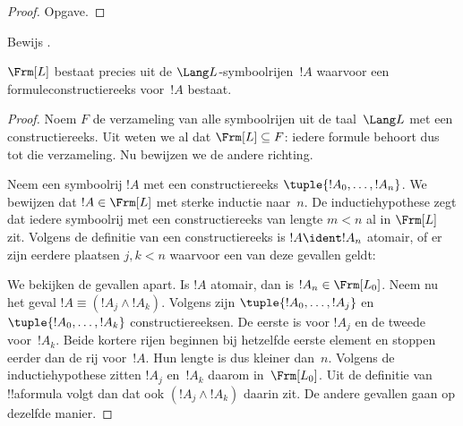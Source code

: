\documentclass[../../../include/open-logic-section]{subfiles}
\begin{document}
\begin{proof}
Opgave.
\end{proof}

\begin{prob}
Bewijs .
\end{prob}

\begin{thm}
$\Frm[L]$ bestaat precies uit de $\Lang L$-symboolrijen~$!A$
waarvoor een formuleconstructiereeks voor~$!A$ bestaat.
\end{thm}

\begin{proof}
Noem $F$ de verzameling van alle symboolrijen uit de taal~$\Lang L$ met
een constructiereeks. Uit
 weten we al dat
$\Frm[L] \subseteq F$: iedere formule behoort dus tot die verzameling. Nu bewijzen we
de andere richting.

Neem een symboolrij $!A$ met een constructiereeks
$\tuple{!A_0,\dotsc,!A_n}$. We bewijzen dat $!A \in \Frm[L]$ met
sterke inductie naar~$n$. De inductiehypothese zegt dat iedere symboolrij
met een constructiereeks van lengte $m < n$ al in $\Frm[L]$ zit.
Volgens de definitie van een constructiereeks is $!A \ident !A_n$
atomair, of er zijn eerdere plaatsen $j,k < n$ waarvoor een van deze
gevallen geldt:
\begin{enumerate}
\end{enumerate}
We bekijken de gevallen apart. Is $!A$ atomair, dan is
$!A_n \in \Frm[L_0]$. Neem nu het geval
$!A \equiv (!A_j \land !A_k)$. Volgens
 zijn
$\tuple{!A_0,\dotsc,!A_j}$ en $\tuple{!A_0,\dotsc,!A_k}$
constructiereeksen. De eerste is voor $!A_j$ en de tweede voor~$!A_k$.
Beide kortere rijen beginnen bij hetzelfde eerste element en stoppen
eerder dan de rij voor~$!A$. Hun lengte is dus kleiner dan~$n$.
Volgens de inductiehypothese zitten $!A_j$ en~$!A_k$
daarom in~$\Frm[L_0]$. Uit de definitie van !!a{formula} volgt dan dat
ook $(!A_j \land !A_k)$ daarin zit. De andere gevallen gaan op dezelfde
manier.
\end{proof}
\end{document}
